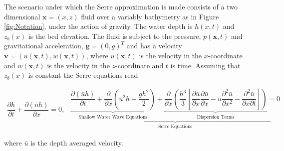 \documentclass[SingleSpace,12pt,Proceedings]{Serre_ASCE}
\begin{document}
The scenario under which the Serre approximation is made consists of a two dimensional $\textbf{x} = (x,z)$ fluid over a variably bathymetry as in Figure \ref{fig:Notation}, under the action of gravity. The water depth is $h(x,t)$ and $z_b(x)$ is the bed elevation. The fluid is subject to the pressure, $p(\textbf{x},t)$ and gravitational acceleration, $\textbf{g} = (0,g)^T$ and has a velocity $\textbf{v} = (u(\textbf{x},t),w(\textbf{x},t))$, where $u(\textbf{x},t)$ is the velocity in the $x$-coordinate and $w(\textbf{x},t)$ is the velocity in the $z$-coordinate and $t$ is time. Assuming that $z_b(x)$ is constant the Serre equations read \cite{Guyenne-etal-2014-169,Zoppou-2014}
\begin{linenomath*}
\begin{subequations}\label{eq:Serre_conservative_form}
\begin{gather}
\dfrac{\partial h}{\partial t} + \dfrac{\partial (\bar{u}h)}{\partial x} = 0,
\label{eq:Serre_continuity}
\end{gather}
\begin{gather}
\underbrace{\underbrace{\dfrac{\partial (\bar{u}h)}{\partial t} + \dfrac{\partial}{\partial x} \left ( \bar{u}^2h + \dfrac{gh^2}{2}\right )}_{\text{Shallow Water Wave Equations}} + \underbrace{\dfrac{\partial}{\partial x} \left (  \dfrac{h^3}{3} \left [ \dfrac{\partial \bar{u} }{\partial x} \dfrac{\partial \bar{u}}{\partial x} - \bar{u} \dfrac{\partial^2 \bar{u}}{\partial x^2}  - \dfrac{\partial^2 \bar{u}}{\partial x \partial t}\right ] \right )}_{\text{Dispersion Terms}} = 0}_{\text{Serre Equations}}
\label{eq:Serre_momentum}
\end{gather}
\end{subequations}
\end{linenomath*}
where $\bar{u}$ is the depth averaged velocity.
\end{document}
